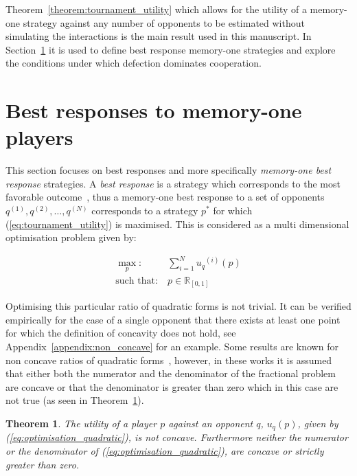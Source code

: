 \documentclass[10pt]{article}
\newcommand{\R}{\mathbb{R}}
\newtheorem{theorem}{Theorem}
\begin{document}
Theorem~\ref{theorem:tournament_utility} which allows for the utility of a
memory-one strategy against any number of opponents to be estimated without
simulating the interactions is the main result used in this manuscript. In
Section~\ref{section:best_response_mem_one} it is used to  define best response
memory-one strategies and explore the conditions under which defection dominates
cooperation.

\section{Best responses to memory-one players}\label{section:best_response_mem_one}

This section focuses on best responses and more specifically \textit{memory-one
best response} strategies. A \textit{best response} is a strategy which
corresponds to the most favorable outcome~\cite{Tadelis2013}, thus a memory-one
best response to a set of opponents \(q^{(1)}, q^{(2)}, \dots, q^{(N)}\) corresponds to a strategy \(p^*\) for which
(\ref{eq:tournament_utility}) is maximised. This is considered as a multi
dimensional optimisation problem given by:

\begin{equation}\label{eq:mo_tournament_optimisation}
    \begin{aligned}
    \max_p: & \ \sum_{i=1} ^ {N} {u_q}^{(i)} (p)
    \\
    \text{such that}: & \ p \in \R_{[0, 1]}
    \end{aligned}
\end{equation}

Optimising this particular ratio of quadratic forms is not trivial. It can be
verified empirically for the case of a single opponent that there exists at least
one point for which the definition of concavity does not hold, see Appendix~\ref{appendix:non_concave}
for an example. Some results are
known for non concave ratios of quadratic forms~\cite{Beck2009, Hongyan2014},
however, in these works it is assumed that either both the numerator and the
denominator of the fractional problem are concave or that the denominator is
greater than zero which in this case are not true
(as seen in Theorem~\ref{theorem:concavity}).

\begin{theorem}\label{theorem:concavity}
    The utility of a player \(p\) against an opponent \(q\), \(u_q (p)\), given
    by (\ref{eq:optimisation_quadratic}), is not concave. Furthermore neither
    the numerator or the denominator of (\ref{eq:optimisation_quadratic}), are
    concave or strictly greater than zero.
\end{theorem}
\end{document}
